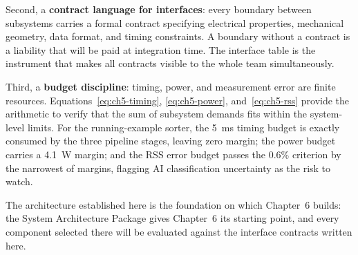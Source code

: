 Second, a \textbf{contract language for interfaces}: every boundary between subsystems carries a formal contract specifying electrical properties, mechanical geometry, data format, and timing constraints.
A boundary without a contract is a liability that will be paid at integration time.
The interface table is the instrument that makes all contracts visible to the whole team simultaneously.

Third, a \textbf{budget discipline}: timing, power, and measurement error are finite resources.
Equations~\ref{eq:ch5-timing}, \ref{eq:ch5-power}, and~\ref{eq:ch5-rss} provide the arithmetic to verify that the sum of subsystem demands fits within the system-level limits.
For the running-example sorter, the 5~ms timing budget is exactly consumed by the three pipeline stages, leaving zero margin; the power budget carries a 4.1~W margin; and the RSS error budget passes the 0.6\% criterion by the narrowest of margins, flagging AI classification uncertainty as the risk to watch.

The architecture established here is the foundation on which Chapter~6 builds: the System Architecture Package gives Chapter~6 its starting point, and every component selected there will be evaluated against the interface contracts written here.
